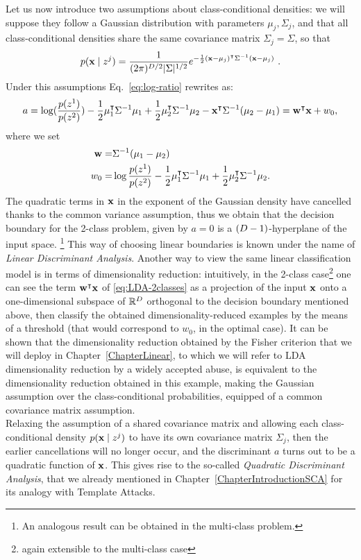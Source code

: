 Let us now introduce two assumptions about class-conditional densities: we will suppose they follow a Gaussian distribution with parameters $\mu_j, \Sigma_j$, and that all class-conditional densities share the same covariance matrix $\Sigma_j=\Sigma$, so that
\begin{equation}
p(\textbf{x}\mid z^j) = \frac{1}{(2\pi)^{{D}/2}\lvert \Sigma\rvert^{1/2}}e^{-\frac{1}{2}(\textbf{x}- \mu_j)^\intercal\Sigma^{-1}(\textbf{x}- \mu_j)} \mbox{ .}
\end{equation}
Under this assumptions Eq.~\eqref{eq:log-ratio} rewrites as: 
\begin{equation}\label{eq:LDA-2classes}
a = \log(\frac{p(z^1)}{p(z^2)}) - \frac{1}{2}\mu_1^\intercal\Sigma^{-1}\mu_1 + \frac{1}{2}\mu_2^\intercal\Sigma^{-1}\mu_2 - \textbf{x}^\intercal\Sigma^{-1}(\mu_2-\mu_1) = \textbf{w}^\intercal \textbf{x} + w_0, 
\end{equation}
where we set 
\begin{align*}
\textbf{w} =& \Sigma^{-1}(\mu_1-\mu_2)\\
w_0 =  & \log\frac{p(z^1)}{p(z^2)} - \frac{1}{2}\mu_1^\intercal\Sigma^{-1}\mu_1 + \frac{1}{2}\mu_2^\intercal\Sigma^{-1}\mu_2 . 
\end{align*}
The quadratic terms in $\textbf{x}$ in the exponent of the Gaussian density have cancelled thanks to the common variance assumption, thus we obtain that the decision boundary for the 2-class problem, given by $a=0$ is a $(D - 1)$-hyperplane of the input space. \footnote{An analogous result can be obtained in the multi-class problem.} This way of choosing linear boundaries is known under the name of \emph{Linear Discriminant Analysis}. Another way to view the same linear classification model is in terms of dimensionality reduction: intuitively, in the 2-class case\footnote{again extensible to the multi-class case} one can see the term $\textbf{w}^\intercal \textbf{x}$ of \eqref{eq:LDA-2classes} as a projection of the input $\textbf{x}$ onto a one-dimensional subspace of $\mathbb{R}^D$ orthogonal to the decision boundary mentioned above, then classify the obtained dimensionality-reduced examples by the means of a threshold (that would correspond to $w_0$, in the optimal case). It can be shown that the dimensionality reduction obtained by the Fisher criterion that we will deploy in Chapter~\ref{ChapterLinear}, to which we will refer to LDA dimensionality reduction by a widely accepted abuse, is equivalent to the dimensionality reduction obtained in this example, making the Gaussian assumption over the class-conditional probabilities, equipped of a common covariance matrix assumption.  \\
Relaxing the assumption of a shared covariance matrix and allowing each class-conditional density $p(\textbf{x}\mid z^j)$ to have its own covariance matrix $\Sigma_j$, then the earlier cancellations will no longer occur, and the discriminant $a$ turns out to be a quadratic function of $\textbf{x}$. This gives rise to the so-called \emph{Quadratic Discriminant Analysis}, that we already mentioned in Chapter~\ref{ChapterIntroductionSCA} for its analogy with Template Attacks.\\

